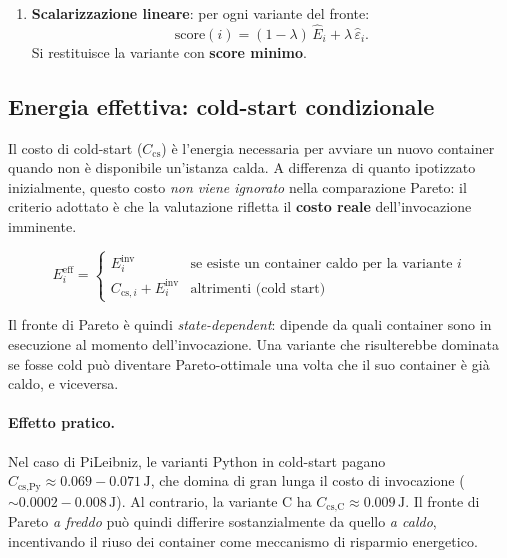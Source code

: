 \documentclass[a4paper,12pt]{article}
\begin{document}
\begin{enumerate}
  \item \textbf{Scalarizzazione lineare}: per ogni variante del fronte:
        \begin{equation}\label{eq:score}
          \text{score}(i) = (1-\lambda)\,\hat{E}_i + \lambda\,\hat{\varepsilon}_i.
        \end{equation}
        Si restituisce la variante con \textbf{score minimo}.
\end{enumerate}

\subsection{Energia effettiva: cold-start condizionale}\label{sec:coldstart}

Il costo di cold-start ($C_{\text{cs}}$) è l'energia necessaria per
avviare un nuovo container quando non è disponibile un'istanza calda.
A differenza di quanto ipotizzato inizialmente, questo costo
\emph{non viene ignorato} nella comparazione Pareto: il criterio
adottato è che la valutazione rifletta il \textbf{costo reale}
dell'invocazione imminente.

\begin{equation}\label{eq:effective}
  E_i^{\text{eff}} =
  \begin{cases}
    E_i^{\text{inv}} & \text{se esiste un container caldo per la variante } i \\
    C_{\text{cs},i} + E_i^{\text{inv}} & \text{altrimenti (cold start)}
  \end{cases}
\end{equation}

Il fronte di Pareto è quindi \emph{state-dependent}: dipende da quali
container sono in esecuzione al momento dell'invocazione.  Una variante
che risulterebbe dominata se fosse cold può diventare Pareto-ottimale
una volta che il suo container è già caldo, e viceversa.

\paragraph{Effetto pratico.}
Nel caso di PiLeibniz, le varianti Python in cold-start pagano
$C_{\text{cs,Py}} \approx 0.069{-}0.071\,\text{J}$, che domina di
gran lunga il costo di invocazione ($\sim 0.0002{-}0.008\,\text{J}$).
Al contrario, la variante C ha $C_{\text{cs,C}} \approx 0.009\,\text{J}$.
Il fronte di Pareto \emph{a freddo} può quindi differire
sostanzialmente da quello \emph{a caldo}, incentivando il riuso
dei container come meccanismo di risparmio energetico.
\end{document}

